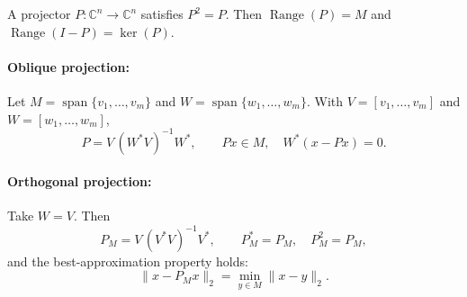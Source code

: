 A projector \(P:\mathbb{C}^n\to\mathbb{C}^n\) satisfies \(P^2=P\).
Then \(\operatorname{Range}(P)=M\) and \(\operatorname{Range}(I-P)=\ker(P)\).

\paragraph{Oblique projection:}
Let \(M=\operatorname{span}\{v_1,\ldots,v_m\}\) and \(W=\operatorname{span}\{w_1,\ldots,w_m\}\).
With \(V=[v_1,\ldots,v_m]\) and \(W=[w_1,\ldots,w_m]\),
\[
P=V\,(W^*V)^{-1}W^*,\qquad Px\in M,\quad W^*(x-Px)=0.
\]

\paragraph{Orthogonal projection:}
Take \(W=V\). Then
\[
P_M=V\,(V^*V)^{-1}V^*,\qquad P_M^*=P_M,\quad P_M^2=P_M,
\]
and the best-approximation property holds:
\[
\|x-P_Mx\|_2=\min_{y\in M}\|x-y\|_2.
\]
